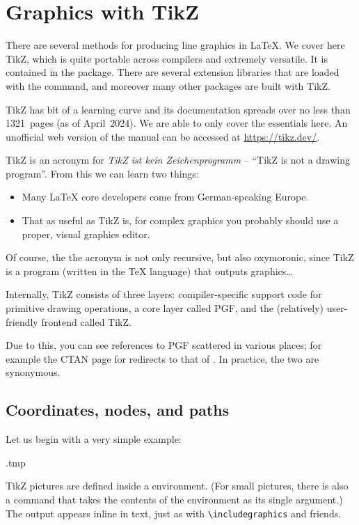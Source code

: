 \chapter{Graphics with TikZ}

There are several methods for producing line graphics in \LaTeX.
We cover here TikZ, which is quite portable across compilers and extremely versatile.
It is contained in the  package.
There are several extension libraries that are loaded with the  command,
and moreover many other packages are built with TikZ.

TikZ has bit of a learning curve
and its documentation spreads over no less than 1321~pages (as of April~2024).
We are able to only cover the essentials here.
An unofficial web version of the manual can be accessed at \url{https://tikz.dev/}.

\begin{technote}
TikZ is an acronym for \emph{TikZ ist kein Zeichenprogramm}
-- ``TikZ is not a drawing program''.
From this we can learn two things:
\begin{itemize}
\item Many \LaTeX{} core developers come from German-speaking Europe.
\item That as useful as TikZ is,
    for complex graphics you probably should use a proper, visual graphics editor.
\end{itemize}
Of course, the the acronym is not only recursive,
but also oxymoronic, since TikZ is a program (written in the \TeX{} language)
that outputs graphics\dots
\end{technote}

\begin{technote}
Internally, TikZ consists of three layers:
compiler-specific support code for primitive drawing operations,
a core layer called PGF,
and the (relatively) user-friendly frontend called TikZ.

Due to this, you can see references to PGF scattered in various places;
for example the CTAN page for  redirects to that of .
In practice, the two are synonymous.
\end{technote}


%
%
\section{Coordinates, nodes, and paths}

Let us begin with a very simple example:
%
\begin{VerbatimOut}{\jobname.tmp}
\end{VerbatimOut}
\ShowExample
%
TikZ pictures are defined inside a  environment.
(For small pictures, there is also a  command
that takes the contents of the environment as its single argument.)
The output appears inline in text, just as with \verb|\includegraphics| and friends.

